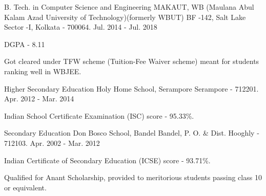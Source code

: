 


\begin{cventries}


\cventry
{B. Tech.  in Computer Science and Engineering} %
{MAKAUT, WB (Maulana Abul Kalam Azad University of Technology)\newline (formerly WBUT)} %
{BF -142, Salt Lake Sector -I, \newline
Kolkata - 700064.} %
{Jul. 2014 - Jul. 2018} %
{ %
\begin{cvitems}
\item {DGPA - 8.11}
\item {Got cleared under TFW scheme (Tuition-Fee Waiver scheme) meant for students ranking well in WBJEE.}
\end{cvitems}
}


\cventry
{Higher Secondary Education} %
{Holy Home School, Serampore} %
{Serampore - 712201.} %
{Apr. 2012 - Mar. 2014} %
{ %
\begin{cvitems}
\item {Indian School Certificate Examination (ISC) score - 95.33\%.}
\end{cvitems}
}


\cventry
{Secondary Education} %
{Don Bosco School, Bandel} %
{Bandel, P. O. \& Dist. Hooghly - 712103.} %
{Apr. 2002 - Mar. 2012} %
{ %
\begin{cvitems}
\item {Indian Certificate of Secondary Education (ICSE) score  - 93.71\%.}
\item {Qualified for Anant Scholarship, provided to meritorious students passing class 10 or equivalent.}
\end{cvitems}
}


\end{cventries}